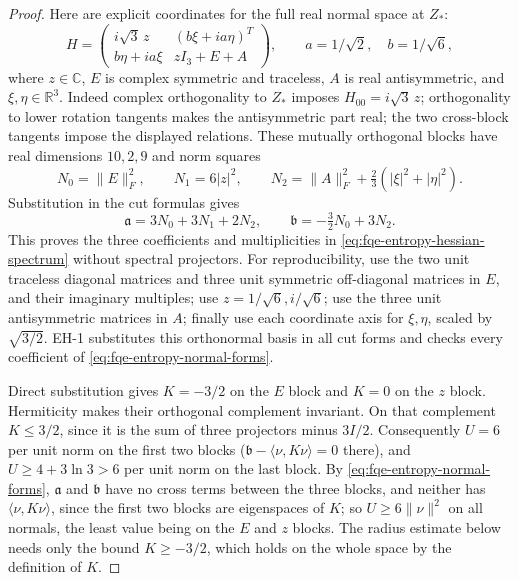 \begin{proof}
Here are explicit coordinates for the full real normal space at $Z_*$:
\begin{equation}\label{eq:fqe-entropy-normal-blocks}
 H=\begin{pmatrix}
 i\sqrt3\,z&(b\xi+ia\eta)^T\\
 b\eta+ia\xi&zI_3+E+A
 \end{pmatrix},\qquad a=1/\sqrt2,\quad b=1/\sqrt6,
\end{equation}
where $z\in\mathbb C$, $E$ is complex symmetric and traceless,
$A$ is real antisymmetric, and $\xi,\eta\in\mathbb R^3$.
Indeed complex orthogonality to $Z_*$ imposes $H_{00}=i\sqrt3\,z$;
orthogonality to lower rotation tangents makes the antisymmetric part
real; the two cross-block tangents impose the displayed relations.
These mutually orthogonal blocks have real dimensions $10,2,9$ and
norm squares
\[
 N_0=\|E\|_F^2,\qquad N_1=6|z|^2,\qquad
 N_2=\|A\|_F^2+\tfrac23(|\xi|^2+|\eta|^2).
\]
Substitution in the cut formulas gives
\begin{equation}\label{eq:fqe-entropy-normal-forms}
 \mathfrak a=3N_0+3N_1+2N_2,\qquad
 \mathfrak b=-\tfrac32N_0+3N_2.
\end{equation}
This proves the three coefficients and multiplicities in
\eqref{eq:fqe-entropy-hessian-spectrum} without spectral projectors.
For reproducibility, use the two unit traceless diagonal matrices and
three unit symmetric off-diagonal matrices in $E$, and their imaginary
multiples; use $z=1/\sqrt6,i/\sqrt6$; use the three unit antisymmetric
matrices in $A$; finally use each coordinate axis for $\xi,\eta$, scaled
by $\sqrt{3/2}$. EH-1 substitutes this orthonormal basis in all cut
forms and checks every coefficient of \eqref{eq:fqe-entropy-normal-forms}.

Direct substitution gives $K=-3/2$ on the $E$ block and $K=0$ on the
$z$ block. Hermiticity makes their orthogonal complement invariant.
On that complement $K\le3/2$, since it is the sum of three projectors
minus $3I/2$. Consequently $U=6$ per unit norm on the first two blocks
($\mathfrak b-\langle\nu,K\nu\rangle=0$ there),
and $U\ge4+3\ln3>6$ per unit norm on the last block. By \eqref{eq:fqe-entropy-normal-forms}, $\mathfrak a$ and $\mathfrak b$
have no cross terms between the three blocks, and neither has $\langle\nu,K\nu\rangle$, since the first two blocks are
eigenspaces of $K$; so $U\ge6\|\nu\|^2$ on all normals,
the least value being on the $E$ and $z$ blocks. The radius estimate below needs only the
bound $K\ge-3/2$, which holds on the whole space by the definition of $K$.


\end{proof}
